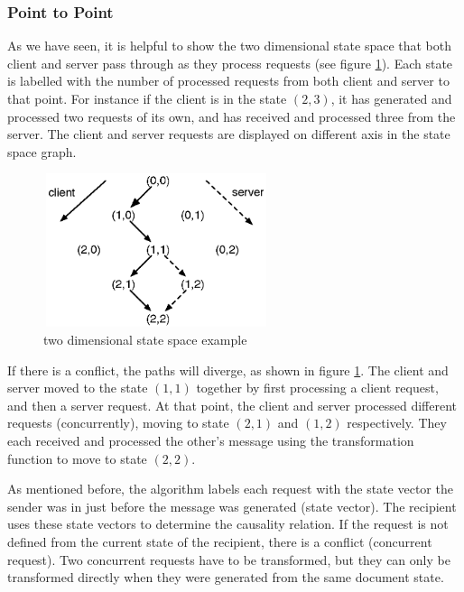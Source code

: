 \subsubsection{Point to Point}
As we have seen, it is helpful to show the two dimensional state space that both client and server pass through as they process requests (see figure \ref{fig:concepts.statespace}). Each state is labelled with the number of processed requests from both client and server to that point. For instance if the client is in the state $(2,3)$, it has generated and processed two requests of its own, and has received and processed three from the server. The client and server requests are displayed on different axis in the state space graph.

\begin{figure}[htb]
 \centering
 \includegraphics[width=6.63cm,height=4.5cm]{../images/finalreport/concepts_statespace.eps}
 \caption{two dimensional state space example}
 \label{fig:concepts.statespace}
\end{figure}

If there is a conflict, the paths will diverge, as shown in figure \ref{fig:concepts.statespace}. The client and server moved to the state $(1,1)$ together by first processing a client request, and then a server request. At that point, the client and server processed different requests (concurrently), moving to state $(2,1)$ and $(1,2)$ respectively. They each received and processed the other's message using the transformation function to move to state $(2,2)$.

As mentioned before, the algorithm labels each request with the state vector the
sender was in just before the message was generated (state vector). The 
recipient uses these state vectors to determine the causality relation.
If the request is not defined from the current state of the 
recipient, there is a conflict (concurrent request). Two concurrent requests 
have to be transformed, but they can only be transformed directly when they were 
generated from the same document state.

